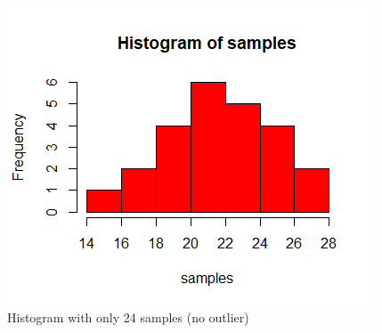 \documentclass[11pt]{article}
\begin{document}
\begin{enumerate}[a.]
\begin{figure}[h!]
    \centering
    \includegraphics[scale=1]{./pics/histWithoutOutlier.png}
    \caption{Histogram with only 24 samples (no outlier)}
    \label{fig:histWithout}
\end{figure}

\end{enumerate}
\end{document}
